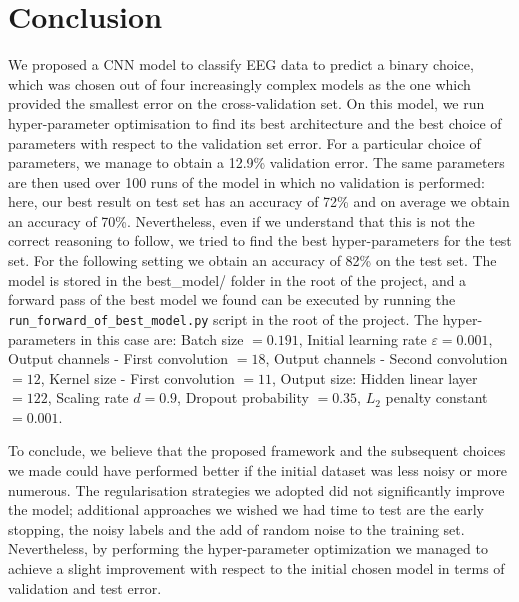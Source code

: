 \documentclass{article}
\begin{document}
 \section{Conclusion}\label{sec_conclusion}
 We proposed a CNN model to classify  EEG data to predict a binary choice, which was chosen out of four  increasingly complex models as the one which provided the smallest error on the cross-validation set. 
 On this model, we run hyper-parameter optimisation to find its best architecture and the best choice of parameters with respect to the validation set error. For a particular choice of parameters, we manage to obtain a 12.9\% validation error. The same parameters are then used over 100 runs of the model in which no validation is performed: here, our best result on test set has an accuracy of 72\% and on average we obtain an accuracy of 70\%. 
 Nevertheless,  even if we understand that this is not the correct reasoning to follow, we tried to find the best hyper-parameters for the test set.  For the following setting we obtain an accuracy of 82\% on the test set. The model is stored in the best\_model/ folder in the root of the project, and a forward pass of the best model we found can be executed by running the \verb|run_forward_of_best_model.py| script in the root of the project.
 The hyper-parameters in this case are:
 Batch size $ =  0.191$,  Initial learning rate $\varepsilon  = 0.001$,  Output channels - First convolution  $= 18$, Output channels - Second convolution $= 12$, Kernel size - First convolution $= 11$, Output size: Hidden linear layer $ = 122$,  Scaling rate $d = 0.9$, Dropout probability $=  0.35$,  $L_2$ penalty constant $=0.001$.

 To conclude, we believe that the proposed framework and the subsequent choices we made could have performed better if the initial dataset was less noisy or more numerous. The regularisation strategies we adopted did not significantly improve the model; additional approaches we wished we had time to test are the early stopping, the noisy labels and the add of random noise to the training set. Nevertheless, by performing the hyper-parameter optimization we managed to achieve a slight improvement with respect to the initial chosen model in terms of validation and test error.
 

 
  
  
  
\end{document}
